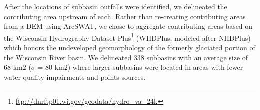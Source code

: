 After the locations of subbasin outfalls were identified, we delineated the contributing area upstream of each.
Rather than re-creating contributing areas from a DEM using ArcSWAT, we chose to aggregate contributing areas based on the Wisconsin Hydrography Dataset Plus\footnote{\url{ftp://dnrftp01.wi.gov/geodata/hydro_va_24k}} (WHDPlus, modeled after NHDPlus) which honors the undeveloped geomorphology of the formerly glaciated portion of the Wisconsin River basin.
We delineated 338 subbasins with an average size of 68 km$2$ ($\sigma$ = 80 km$2$) where larger subbasins were located in areas with fewer water quality impairments and points sources.